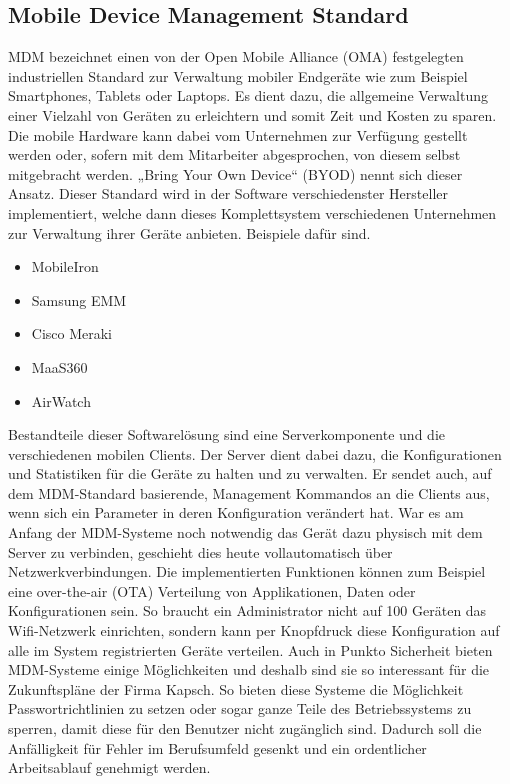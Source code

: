 \subsection{Mobile Device Management Standard}
MDM bezeichnet einen von der Open Mobile Alliance (OMA) festgelegten industriellen Standard zur Verwaltung mobiler Endgeräte wie zum Beispiel Smartphones, Tablets oder Laptops. Es dient dazu, die allgemeine Verwaltung einer Vielzahl von Geräten zu erleichtern und somit Zeit und Kosten zu sparen. Die mobile Hardware kann dabei vom Unternehmen zur Verfügung gestellt werden oder, sofern mit dem Mitarbeiter abgesprochen, von diesem selbst mitgebracht werden. „Bring Your Own Device“ (BYOD) nennt sich dieser Ansatz. Dieser Standard wird in der Software verschiedenster Hersteller implementiert, welche dann dieses Komplettsystem verschiedenen Unternehmen zur Verwaltung ihrer Geräte anbieten. Beispiele dafür sind.
\begin{itemize}
	\item MobileIron
	\item Samsung EMM
	\item Cisco Meraki
	\item MaaS360
	\item AirWatch
\end{itemize}
Bestandteile dieser Softwarelösung sind eine Serverkomponente und die verschiedenen mobilen Clients. Der Server dient dabei dazu, die Konfigurationen und Statistiken für die Geräte zu halten und zu verwalten. Er sendet auch, auf dem MDM-Standard basierende, Management Kommandos an die Clients aus, wenn sich ein Parameter in deren Konfiguration verändert hat. War es am Anfang der MDM-Systeme noch notwendig das Gerät dazu physisch mit dem Server zu verbinden, geschieht dies heute vollautomatisch über Netzwerkverbindungen. Die implementierten Funktionen können zum Beispiel eine over-the-air (OTA) Verteilung von Applikationen, Daten oder Konfigurationen sein. So braucht ein Administrator nicht auf 100 Geräten das Wifi-Netzwerk einrichten, sondern kann per Knopfdruck diese Konfiguration auf alle im System registrierten Geräte verteilen.  Auch in Punkto Sicherheit bieten MDM-Systeme einige Möglichkeiten und deshalb sind sie so interessant für die Zukunftspläne der Firma Kapsch. So bieten diese Systeme die Möglichkeit Passwortrichtlinien zu setzen oder sogar ganze Teile des Betriebssystems zu sperren, damit diese für den Benutzer nicht zugänglich sind. Dadurch soll die Anfälligkeit für Fehler im Berufsumfeld gesenkt und ein ordentlicher Arbeitsablauf genehmigt werden.

